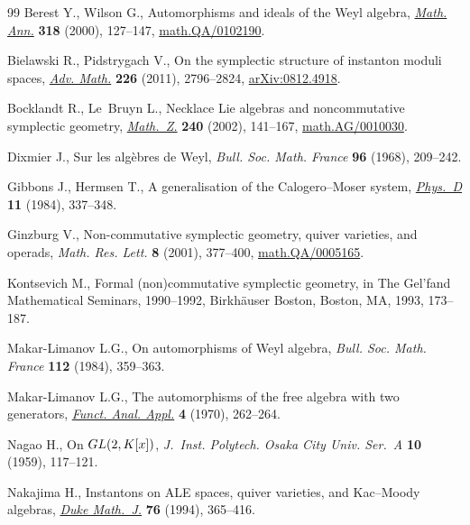 \documentclass[11pt]{article}
\begin{document}
\begin{thebibliography}{99}
Berest Y., Wilson G., Automorphisms and ideals of the {W}eyl algebra,
  \href{http://dx.doi.org/10.1007/s002080000115}{\textit{Math. Ann.}} \textbf{318} (2000), 127--147, \href{http://arxiv.org/abs/math.QA/0102190}{math.QA/0102190}.

Bielawski R., Pidstrygach V., On the symplectic structure of instanton moduli
  spaces, \href{http://dx.doi.org/10.1016/j.aim.2010.10.001}{\textit{Adv. Math.}} \textbf{226} (2011), 2796--2824,
  \href{http://arxiv.org/abs/0812.4918}{arXiv:0812.4918}.

Bocklandt R., Le~Bruyn L., Necklace {L}ie algebras and noncommutative
  symplectic geometry, \href{http://dx.doi.org/10.1007/s002090100366}{\textit{Math.~Z.}} \textbf{240} (2002), 141--167,
  \href{http://arxiv.org/abs/math.AG/0010030}{math.AG/0010030}.

Dixmier J., Sur les alg\`ebres de {W}eyl, \textit{Bull. Soc. Math. France}
  \textbf{96} (1968), 209--242.

Gibbons J., Hermsen T., A generalisation of the {C}alogero--{M}oser system,
  \href{http://dx.doi.org/10.1016/0167-2789(84)90015-0}{\textit{Phys.~D}} \textbf{11} (1984), 337--348.

Ginzburg V., Non-commutative symplectic geometry, quiver varieties, and
  operads, \textit{Math. Res. Lett.} \textbf{8} (2001), 377--400,
  \href{http://arxiv.org/abs/math.QA/0005165}{math.QA/0005165}.

Kontsevich M., Formal (non)commutative symplectic geometry, in The {G}el'fand
  {M}athematical {S}eminars, 1990--1992, Birkh\"auser Boston, Boston, MA, 1993,
  173--187.

Makar-Limanov L.G., On automorphisms of {W}eyl algebra, \textit{Bull. Soc.
  Math. France} \textbf{112} (1984), 359--363.

Makar-Limanov L.G., The automorphisms of the free algebra with two generators,
  \href{http://dx.doi.org/10.1007/BF01075252}{\textit{Funct. Anal. Appl.}} \textbf{4} (1970), 262--264.


Nagao H., On {${\rm GL}(2,K[x])$}, \textit{J.~Inst. Polytech. Osaka City
  Univ. Ser.~A} \textbf{10} (1959), 117--121.

Nakajima H., Instantons on {ALE} spaces, quiver varieties, and {K}ac--{M}oody
  algebras, \href{http://dx.doi.org/10.1215/S0012-7094-94-07613-8}{\textit{Duke Math.~J.}} \textbf{76} (1994), 365--416.


\end{thebibliography}
\end{document}
